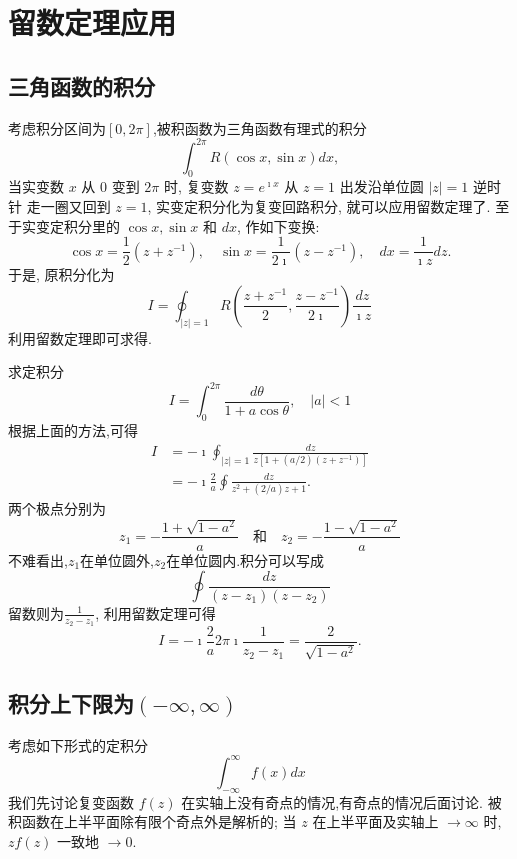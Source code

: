 \section{留数定理应用}
\subsection{三角函数的积分}
考虑积分区间为$\left[ 0, 2\pi \right]$,被积函数为三角函数有理式的积分
\begin{equation}
    \int_{0}^{2\pi} R(\cos{x}, \sin{x}) dx,
\end{equation}
当实变数 $x$ 从 0 变到 $2 \pi$ 时, 复变数 $z=e^{\imath x}$ 从 $z=1$ 出发沿单位圆 $|z|=1$ 逆时针 走一圈又回到 $z=1$,
实变定积分化为复变回路积分, 就可以应用留数定理了. 至于实变定积分里的 $\cos x, \sin x$ 和 $d x$, 作如下变换:
$$
\cos x=\frac{1}{2}\left(z+z^{-1}\right), \quad \sin x=\frac{1}{2 \imath}\left(z-z^{-1}\right), \quad d x=\frac{1}{\imath z} d z .
$$
于是, 原积分化为
$$
I=\oint_{|z|=1} R\left(\frac{z+z^{-1}}{2}, \frac{z-z^{-1}}{2 \imath}\right) \frac{d z}{\imath z}
$$
利用留数定理即可求得.

\begin{examplebox}{求定积分\[I=\int_0^{2 \pi} \frac{d \theta}{1+a \cos \theta}, \quad|a|<1 \]}
    根据上面的方法,可得
    \[
        \begin{aligned}
        I & =-\imath \oint_{|z|=1} \frac{d z}{z\left[1+(a / 2)\left(z+z^{-1}\right)\right]} \\
        & =-\imath \frac{2}{a} \oint \frac{d z}{z^2+(2 / a) z+1} .
        \end{aligned}
    \]
    两个极点分别为
    \[
        z_1=-\frac{1+\sqrt{1-a^2}}{a} \quad \text {和} \quad z_2=-\frac{1-\sqrt{1-a^2}}{a}
    \]
    不难看出,$z_1$在单位圆外,$z_2$在单位圆内.积分可以写成
    \[
      \oint \frac{dz}{(z-z_1)(z-z_2)}   
    \]
    留数则为$\frac{1}{z_2 - z_1}$, 利用留数定理可得 
    \[
      I=  -\imath \frac{2}{a} 2\pi\imath \frac{1}{z_2 - z_1} = \frac{2}{\sqrt{1 - a^2}} . 
    \]
\end{examplebox}



\subsection{积分上下限为$( -\infty, \infty)$}
 考虑如下形式的定积分
 \[
    \int_{-\infty}^{\infty} f(x) dx
 \]
 我们先讨论复变函数 $f(z)$ 在实轴上没有奇点的情况,有奇点的情况后面讨论. 
被积函数在上半平面除有限个奇点外是解析的; 当 $z$ 在上半平面及实轴上 $\to \infty$ 时, 
$z f(z)$ 一致地 $\to 0$.

